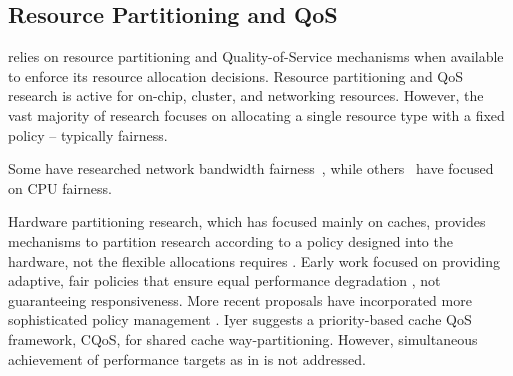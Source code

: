 %

\subsection{Resource Partitioning and QoS}
\label{sec:rel:pm}


\pacora relies on resource partitioning and Quality-of-Service mechanisms when available to enforce its resource allocation decisions.  Resource partitioning and QoS research is active for on-chip, cluster, and networking resources.  However, the vast majority of research focuses on allocating a single resource type with a fixed policy -- typically fairness.

Some have researched network bandwidth fairness~\cite{Blanquer, Kleinberg99fairnessin, Liu}, while others~\cite{Baruah96proportionateprogress, Baruah_fastscheduling, Zhu} have focused on CPU fairness. 

Hardware partitioning research, which has focused mainly on caches, provides mechanisms to partition research according to a policy designed into the hardware, not the flexible allocations \pacora requires \cite{876484, 967444,1194855,1275005,1194858,1318096,1088154,1399973,1069998,1399982} .  Early work focused on providing adaptive, fair policies that ensure equal performance degradation \cite{605420,1086328}, not guaranteeing responsiveness. More recent proposals have incorporated more sophisticated policy management \cite{1241608,1331730,1152161,1254886}. Iyer\cite{1006246} suggests a priority-based cache QoS framework, CQoS, for shared cache way-partitioning. 
However, simultaneous achievement of performance targets as in \pacora is not addressed.





